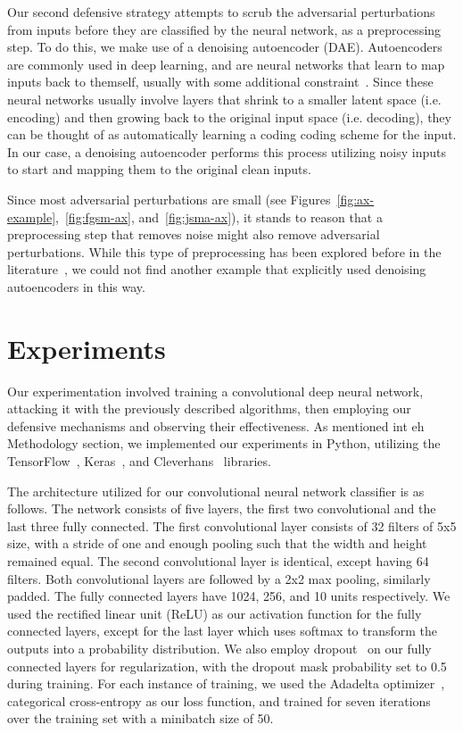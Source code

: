 \documentclass{article}
\begin{document}
Our second defensive strategy attempts to scrub the adversarial perturbations
from inputs before they are classified by the neural network, as a preprocessing
step. To do this, we make use of a denoising autoencoder (DAE). Autoencoders are
commonly used in deep learning, and are neural networks that learn to map inputs
back to themself, usually with some additional
constraint~\cite{goodfellow2016deep}. Since these neural networks usually
involve layers that shrink to a smaller latent space (i.e\@. encoding) and then
growing back to the original input space (i.e\@. decoding), they can be thought
of as automatically learning a coding coding scheme for the input. In our case,
a denoising autoencoder performs this process utilizing noisy inputs to start
and mapping them to the original clean inputs.

Since most adversarial perturbations are small (see
Figures~\ref{fig:ax-example},~\ref{fig:fgsm-ax}, and~\ref{fig:jsma-ax}), it
stands to reason that a preprocessing step that removes noise might also remove
adversarial perturbations. While this type of preprocessing has been explored
before in the literature~\cite{graese2016assessing,shenape}, we could not find
another example that explicitly used denoising autoencoders in this way.

\section{Experiments}

Our experimentation involved training a convolutional deep neural network,
attacking it with the previously described algorithms, then employing our
defensive mechanisms and observing their effectiveness. As mentioned int eh
Methodology section, we implemented our experiments in Python, utilizing the
TensorFlow~\cite{abadi2016tensorflow}, Keras~\cite{chollet2015keras}, and
Cleverhans~\cite{goodfellow2016cleverhans} libraries.

The architecture utilized for our convolutional neural network classifier is as
follows. The network consists of five layers, the first two convolutional and
the last three fully connected. The first convolutional layer consists of 32
filters of 5x5 size, with a stride of one and enough pooling such that the width
and height remained equal. The second convolutional layer is identical, except
having 64 filters. Both convolutional layers are followed by a 2x2 max pooling,
similarly padded. The fully connected layers have 1024, 256, and 10 units
respectively. We used the rectified linear unit (ReLU) as our activation
function for the fully connected layers, except for the last layer which uses
softmax to transform the outputs into a probability distribution. We also
employ dropout~\cite{srivastava2014dropout} on our fully connected layers for
regularization, with the dropout mask probability set to 0.5 during training.
For each instance of training, we used the Adadelta
optimizer~\cite{zeiler2012adadelta}, categorical cross-entropy as our loss
function, and trained for seven iterations over the training set with a
minibatch size of 50.
\end{document}

